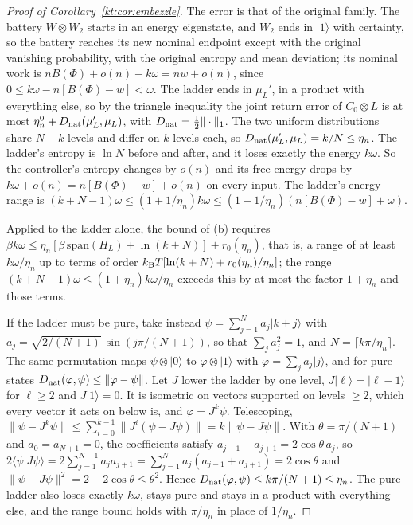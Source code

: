 \begin{proof}[Proof of Corollary~\ref{kt:cor:embezzle}]
The error is that of the original family. The battery $W\otimes W_2$ starts in an energy eigenstate, and $W_2$ ends in $|1\rangle$ with certainty, so the battery reaches its new nominal endpoint except with the original vanishing probability, with the original entropy and mean deviation; its nominal work is $nB(\Phi)+o(n)-k\omega=nw+o(n)$, since $0\le k\omega-n[B(\Phi)-w]<\omega$. The ladder ends in $\mu_L'$, in a product with everything else, so by the triangle inequality the joint return error of $C_0\otimes L$ is at most $\eta^0_n+D_{\mathrm{nat}}(\mu_L',\mu_L)$, with $D_{\mathrm{nat}}=\frac12\|\cdot\|_1$. The two uniform distributions share $N-k$ levels and differ on $k$ levels each, so $D_{\mathrm{nat}}(\mu_L',\mu_L)=k/N\le\eta_n$. The ladder's entropy is $\ln N$ before and after, and it loses exactly the energy $k\omega$. So the controller's entropy changes by $o(n)$ and its free energy drops by $k\omega+o(n)=n[B(\Phi)-w]+o(n)$ on every input. The ladder's energy range is $(k+N-1)\omega\le(1+1/\eta_n)k\omega\le(1+1/\eta_n)(n[B(\Phi)-w]+\omega)$.

Applied to the ladder alone, the bound of (b) requires $\beta k\omega\le\eta_n[\beta\,\mathrm{span}(H_L)+\ln(k+N)]+r_0(\eta_n)$, that is, a range of at least $k\omega/\eta_n$ up to terms of order $k_{\mathrm B} T[\ln(k+N)+r_0(\eta_n)/\eta_n]$; the range $(k+N-1)\omega\le(1+\eta_n)k\omega/\eta_n$ exceeds this by at most the factor $1+\eta_n$ and those terms.

If the ladder must be pure, take instead $\psi=\sum_{j=1}^Na_j|k+j\rangle$ with $a_j=\sqrt{2/(N+1)}\,\sin(j\pi/(N+1))$, so that $\sum_ja_j^2=1$, and $N=\lceil k\pi/\eta_n\rceil$. The same permutation maps $\psi\otimes|0\rangle$ to $\varphi\otimes|1\rangle$ with $\varphi=\sum_ja_j|j\rangle$, and for pure states $D_{\mathrm{nat}}(\varphi,\psi)\le\|\varphi-\psi\|$. Let $J$ lower the ladder by one level, $J|\ell\rangle=|\ell-1\rangle$ for $\ell\ge2$ and $J|1\rangle=0$. It is isometric on vectors supported on levels $\ge2$, which every vector it acts on below is, and $\varphi=J^k\psi$. Telescoping, $\|\psi-J^k\psi\|\le\sum_{i=0}^{k-1}\|J^i(\psi-J\psi)\|=k\|\psi-J\psi\|$. With $\theta=\pi/(N+1)$ and $a_0=a_{N+1}=0$, the coefficients satisfy $a_{j-1}+a_{j+1}=2\cos\theta\,a_j$, so $2\langle\psi|J\psi\rangle=2\sum_{j=1}^{N-1}a_ja_{j+1}=\sum_{j=1}^Na_j(a_{j-1}+a_{j+1})=2\cos\theta$ and $\|\psi-J\psi\|^2=2-2\cos\theta\le\theta^2$. Hence $D_{\mathrm{nat}}(\varphi,\psi)\le k\pi/(N+1)\le\eta_n$. The pure ladder also loses exactly $k\omega$, stays pure and stays in a product with everything else, and the range bound holds with $\pi/\eta_n$ in place of $1/\eta_n$.
\end{proof}

